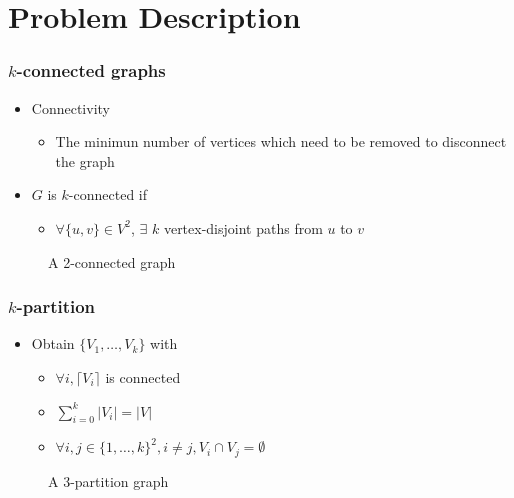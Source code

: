 \section{Problem Description}
\begin{frame}
	\frametitle{$k$-connected graphs}
	\begin{itemize}
		\item Connectivity
			\begin{itemize}
				\item The minimun number of vertices which need to be removed to disconnect the graph 
			\end{itemize}
		\item $G$ is $k$-connected if 
			\begin{itemize}
				\item $\forall \{u,v\} \in V^2$, $\exists$ $k$ vertex-disjoint paths from $u$ to $v$
			\end{itemize}
	\end{itemize}
	\begin{figure}
		\begin{center}
			
		\end{center}
		\caption{A 2-connected graph}
	\end{figure}
\end{frame}

\begin{frame}
  \frametitle{$k$-partition}
  \begin{itemize}
  \item Obtain $\{V_1, \dots, V_k\}$ with
    \begin{itemize}
    \item $\forall i, \lceil V_i \rceil$ is connected
    \item $\sum\limits_{i=0}^k|V_i| = |V|$
    \item $\forall i,j \in \{1, \dots, k\}^2, i \neq j, V_i \cap V_j = \emptyset$
    \end{itemize}
  \end{itemize}
  \begin{figure}
    \begin{center}
      
    \end{center}
    \caption{A 3-partition graph}
  \end{figure}
\end{frame}

